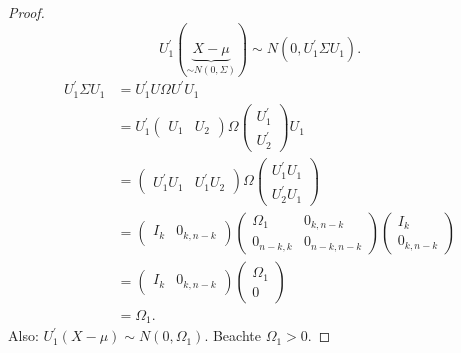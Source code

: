 \documentclass{tstextbook}
\begin{document}
\begin{proof}
	\[
		U_1^\prime(\underbrace{X-\mu}_{\sim N(0,\Sigma)}) \sim N(0,U_1^\prime \Sigma U_1).
	\]
	\[
	\begin{aligned}
	U_1^\prime \Sigma U_1 & = U_1^\prime U \Omega U^\prime U_1 \\
	& = U_1^\prime \begin{pmatrix}
		U_1 & U_2
		\end{pmatrix} \Omega \begin{pmatrix}
		U_1^\prime\\
		U_2^\prime
		\end{pmatrix} U_1 \\
	& = \begin{pmatrix}
		U_1^\prime U_1 & U_1^\prime U_2
	\end{pmatrix} \Omega \begin{pmatrix}
		U_1^\prime U_1\\
		U_2^\prime U_1
	\end{pmatrix} \\
	& = \begin{pmatrix}
		I_k & 0_{k,n-k}
		\end{pmatrix}  
		\begin{pmatrix}
			\Omega_1 		& 0_{k,n-k} \\
			0_{n-k,k}		& 0_{n-k,n-k}
		\end{pmatrix} 
		\begin{pmatrix}
			I_k\\
			0_{k,n-k}
		\end{pmatrix} \\
	& = \begin{pmatrix}
		I_k & 0_{k,n-k}
	\end{pmatrix}  
	\begin{pmatrix}
		\Omega_1  \\
		0
	\end{pmatrix} \\
	& = \Omega_1.
	\end{aligned}
	\]
	Also: $ U_1^\prime (X-\mu) \sim N(0,\Omega_1). $ Beachte $ \Omega_1 > 0. $
	
	
	

\end{proof}
\end{document}
